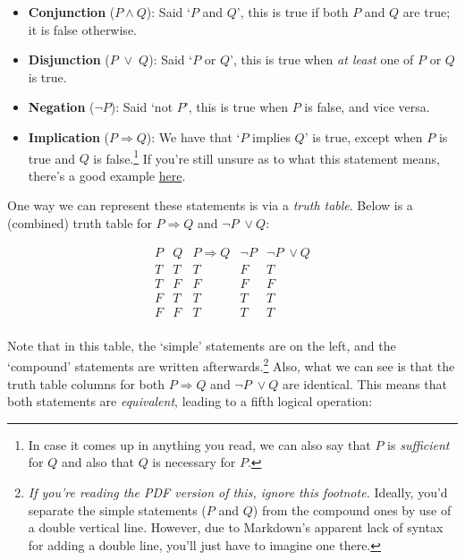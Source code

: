\documentclass[
  10pt,
  a4paper]{article}
\providecommand{\tightlist}{%
  \setlength{\itemsep}{0pt}\setlength{\parskip}{0pt}}
\theoremstyle{plain}
\theoremstyle{definition}
\theoremstyle{plain}
\theoremstyle{plain}
\theoremstyle{plain}
\theoremstyle{plain}
\theoremstyle{definition}
\theoremstyle{definition}
\newtheorem*{Order Axioms*}{Order Axioms}\newtheorem{Order Axioms}{Order Axioms}[section]
\theoremstyle{remark}
\theoremstyle{remark}
\begin{document}
\begin{itemize}
\tightlist
\item
  \textbf{Conjunction} (\(P \wedge Q\)): Said `\(P\) and \(Q\)', this is true if both \(P\) and \(Q\) are true; it is false otherwise.
\item
  \textbf{Disjunction} (\(P \;\vee\; Q\)): Said `\(P\) or \(Q\)', this is true when \emph{at least} one of \(P\) or \(Q\) is true.
\item
  \textbf{Negation} (\(\neg P\)): Said `not \(P\)', this is true when \(P\) is false, and vice versa.
\item
  \textbf{Implication} (\(P\Rightarrow Q\)): We have that `\(P\) implies \(Q\)' is true, except when \(P\) is true and \(Q\) is false.\footnote{In case it comes up in anything you read, we can also say that \(P\) is \emph{sufficient} for \(Q\) and also that \(Q\) is necessary for \(P\).} If you're still unsure as to what this statement means, there's a good example \href{https://simple.wikipedia.org/wiki/Implication_(logic)}{here}.
\end{itemize}

One way we can represent these statements is via a \emph{truth table}. Below is a (combined) truth table for \(P \Rightarrow Q\) and \(\neg P \;\vee Q\):

\begin{equation*}
        \begin{array}{c|c||c|c|c}
            P & Q & P \Rightarrow Q & \neg P & \neg P \; \vee Q  \\
            \hline
            T & T & T & F & T \\
            T & F & F  & F & F \\
            F & T & T  & T & T \\
            F & F & T  & T & T \\
        \end{array}
\end{equation*}

Note that in this table, the `simple' statements are on the left, and the `compound' statements are written afterwards.\footnote{\emph{If you're reading the PDF version of this, ignore this footnote.} Ideally, you'd separate the simple statements (\(P\) and \(Q\)) from the compound ones by use of a double vertical line. However, due to Markdown's apparent lack of syntax for adding a double line, you'll just have to imagine one there.} Also, what we can see is that the truth table columns for both \(P \Rightarrow Q\) and \(\neg P \;\vee Q\) are identical. This means that both statements are \emph{equivalent}, leading to a fifth logical operation:
\end{document}
